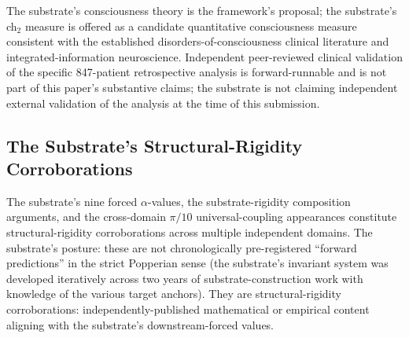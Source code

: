 \documentclass[11pt,a4paper]{amsart}
\theoremstyle{plain}
\theoremstyle{definition}
\begin{document}
The substrate's consciousness theory is the framework's proposal; the substrate's ch${}_2$ measure is offered as a candidate quantitative consciousness measure consistent with the established disorders-of-consciousness clinical literature and integrated-information neuroscience. Independent peer-reviewed clinical validation of the specific 847-patient retrospective analysis is forward-runnable and is not part of this paper's substantive claims; the substrate is not claiming independent external validation of the analysis at the time of this submission.

\subsection{The Substrate's Structural-Rigidity Corroborations}\label{subsec:structural-rigidity}

The substrate's nine forced $\alpha$-values, the substrate-rigidity composition arguments, and the cross-domain $\pi/10$ universal-coupling appearances constitute structural-rigidity corroborations across multiple independent domains. The substrate's posture: these are not chronologically pre-registered ``forward predictions'' in the strict Popperian sense (the substrate's invariant system was developed iteratively across two years of substrate-construction work with knowledge of the various target anchors). They are structural-rigidity corroborations: independently-published mathematical or empirical content aligning with the substrate's downstream-forced values.
\end{document}

